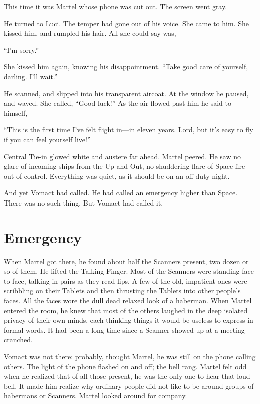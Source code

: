 This time it was Martel whose phone was cut out. The screen went gray.

He turned to Luci. The temper had gone out of his voice. She came to him. She kissed him, and rumpled his hair. All she could say was,

``I'm sorry.''

She kissed him again, knowing his disappointment. ``Take good care of yourself, darling. I'll wait.''

He scanned, and slipped into his transparent aircoat. At the window he paused, and waved. She called, ``Good luck!'' As the air flowed past him he said to himself,

``This is the first time I've felt flight in---in eleven years. Lord, but it's easy to fly if you can feel yourself live!''

Central Tie-in glowed white and austere far ahead. Martel peered. He saw no glare of incoming ships from the Up-and-Out, no shuddering flare of Space-fire out of control. Everything was quiet, as it should be on an off-duty night.

And yet Vomact had called. He had called an emergency higher than Space. There was no such thing. But Vomact had called it.

 
\section{Emergency}

When Martel got there, he found about half the Scanners present, two dozen or so of them. He lifted the Talking Finger. Most of the Scanners were standing face to face, talking in pairs as they read lips. A few of the old, impatient ones were scribbling on their Tablets and then thrusting the Tablets into other people's faces. All the faces wore the dull dead relaxed look of a haberman. When Martel entered the room, he knew that most of the others laughed in the deep isolated privacy of their own minds, each thinking things it would be useless to express in formal words. It had been a long time since a Scanner showed up at a meeting cranched.

Vomact was not there: probably, thought Martel, he was still on the phone calling others. The light of the phone flashed on and off; the bell rang. Martel felt odd when he realized that of all those present, he was the only one to hear that loud bell. It made him realize why ordinary people did not like to be around groups of habermans or Scanners. Martel looked around for company.

